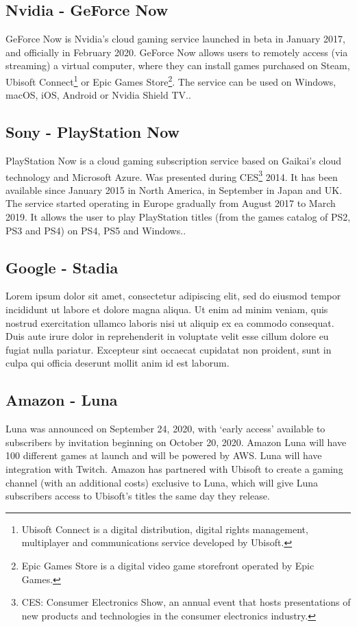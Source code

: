 \subsection{Nvidia - GeForce Now}
GeForce Now is Nvidia's cloud gaming service launched in beta in January 2017, and officially in February 2020. GeForce Now allows users to remotely access (via streaming) a virtual computer, where they can install games purchased on Steam, Ubisoft Connect\footnote{Ubisoft Connect is a digital distribution, digital rights management, multiplayer and communications service developed by Ubisoft.} or Epic Games Store\footnote{Epic Games Store is a digital video game storefront operated by Epic Games.}. The service can be used on Windows, macOS, iOS, Android or Nvidia Shield TV.\cite{GeForce_Now}.

\subsection{Sony - PlayStation Now}
PlayStation Now is a cloud gaming subscription service based on Gaikai's cloud technology and Microsoft Azure. Was presented during CES\footnote{CES: Consumer Electronics Show, an annual event that hosts presentations of new products and technologies in the consumer electronics industry.} 2014. It has been available since January 2015 in North America, in September in Japan and UK. The service started operating in Europe gradually from August 2017 to March 2019.
It allows the user to play PlayStation titles (from the games catalog of PS2, PS3 and PS4) on PS4, PS5 and Windows.\cite{PlayStation_Now}.

\subsection{Google - Stadia}
Lorem ipsum dolor sit amet, consectetur adipiscing elit, sed do eiusmod tempor incididunt ut labore et dolore magna aliqua. Ut enim ad minim veniam, quis nostrud exercitation ullamco laboris nisi ut aliquip ex ea commodo consequat. Duis aute irure dolor in reprehenderit in voluptate velit esse cillum dolore eu fugiat nulla pariatur. Excepteur sint occaecat cupidatat non proident, sunt in culpa qui officia deserunt mollit anim id est laborum\cite{Google_Stadia}.

\subsection{Amazon - Luna}
Luna was announced on September 24, 2020, with ‘early access’ available to subscribers by invitation beginning on October 20, 2020. Amazon Luna will have 100 different games at launch and will be powered by AWS. Luna will have integration with Twitch. Amazon has partnered with Ubisoft to create a gaming channel (with an additional costs) exclusive to Luna, which will give Luna subscribers access to Ubisoft's titles the same day they release\cite{Amazon_Luna}.